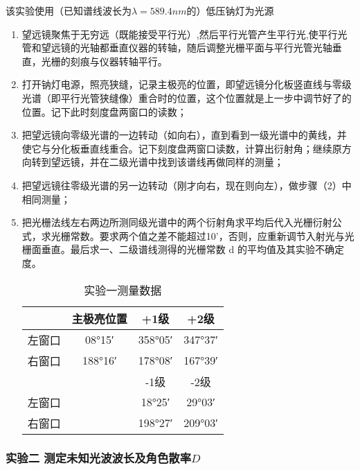 \documentclass[dvipsnames, svgnames,a4paper,11pt]{article}
\begin{document}
	该实验使用（已知谱线波长为$\lambda=589.4nm$的）低压钠灯为光源
	\begin{enumerate}
		\item 望远镜聚焦于无穷远（既能接受平行光）,然后平行光管产生平行光,使平行光管和望远镜的光轴都垂直仪器的转轴，随后调整光栅平面与平行光管光轴垂直，光栅的刻痕与仪器转轴平行。
		
		\item 打开钠灯电源，照亮狭缝，记录主极亮的位置，即望远镜分化板竖直线与零级光谱（即平行光管狭缝像）重合时的位置，这个位置就是上一步中调节好了的位置。记下此时刻度盘两窗口的读数；
		
		\item 把望远镜向零级光谱的一边转动（如向右），直到看到一级光谱中的黄线，并使它与分化板垂直线重合。记下刻度盘两窗口读数，计算出衍射角；继续原方向转到望远镜，并在二级光谱中找到该谱线再做同样的测量；
		
		\item 把望远镜往零级光谱的另一边转动（刚才向右，现在则向左），做步骤（2）中相同测量；
		
		\item 把光栅法线左右两边所测同级光谱中的两个衍射角求平均后代入光栅衍射公式，求光栅常数。要求两个值之差不能超过10’，否则，应重新调节入射光与光栅面垂直。最后求一、二级谱线测得的光栅常数 d 的平均值及其实验不确定度。
		
	\begin{table}[htbp]
		\centering
		\begin{tabular}{|c|c|c|c|}
			\hline
			    & 主极亮位置 & +1级 & +2级 \\
			\hline
			左窗口 & 08°15′ & 358°05′ & 347°37′ \\
			\hline
			右窗口 & 188°16′ & 178°08′ & 167°39′ \\
			\hline
			    &        & -1级 & -2级 \\
			\hline
			左窗口 &      & 18°25′ & 29°03′ \\
			\hline
			右窗口 &      & 198°27′ & 209°03′ \\
			\hline
			
		\end{tabular}
		\caption{实验一测量数据}
		\label{tab:mytable}
	\end{table}
	
	\end{enumerate}

	\subsubsection{实验二 测定未知光波波长及角色散率$D$}
\end{document}
